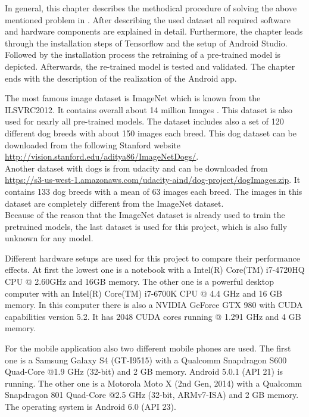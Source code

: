 In general, this chapter describes the methodical procedure of solving the above mentioned problem in . After describing the used dataset all required software and hardware components are explained in detail. Furthermore, the chapter leads through the installation steps of Tensorflow and the setup of Android Studio. Followed by the installation process the retraining of a pre-trained model is depicted. Afterwards, the re-trained model is tested and validated. The chapter ends with the description of the realization of the Android app.

The most famous image dataset is ImageNet which is known from the ILSVRC2012. It contains overall about 14 million Images \citep{ImageNet2010}. This dataset is also used for nearly all pre-trained models. The dataset includes also a set of 120 different dog breeds with about 150 images each breed. This dog dataset can be downloaded from the following Stanford website \url{http://vision.stanford.edu/aditya86/ImageNetDogs/}. \\
Another dataset with dogs is from udacity and can be downloaded from \url{https://s3-us-west-1.amazonaws.com/udacity-aind/dog-project/dogImages.zip}. It contains 133 dog breeds with a mean of 63 images each breed. The images in this dataset are completely different from the ImageNet dataset. \\

Because of the reason that the ImageNet dataset is already used to train the pretrained models, the last dataset is used for this project, which is also fully unknown for any model.

Different hardware setups are used for this project to compare their performance effects.
At first the lowest one is a notebook with a Intel(R) Core(TM) i7-4720HQ CPU @ 2.60GHz and 16GB memory.
The other one is a powerful desktop computer with an Intel(R) Core(TM) i7-6700K CPU @ 4.4 GHz and 16 GB memory.
In this computer there is also a NVIDIA GeForce GTX 980 with CUDA capabilities version 5.2. It has 2048 CUDA cores running @ 1.291 GHz and 4 GB memory.

For the mobile application also two different mobile phones are used. The first one is a Samsung Galaxy S4 (GT-I9515) with a Qualcomm Snapdragon S600 Quad-Core @1.9 GHz (32-bit) and 2 GB memory. Android 5.0.1 (API 21) is running.
The other one is a Motorola Moto X (2nd Gen, 2014) with a Qualcomm Snapdragon 801 Quad-Core @2.5 GHz (32-bit, ARMv7-ISA) and 2 GB memory. The operating system is Android 6.0 (API 23).

